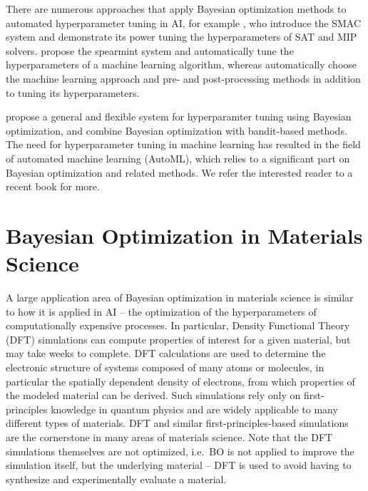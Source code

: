 \documentclass{article}
\begin{document}
There are numerous approaches that apply Bayesian optimization methods to
automated hyperparameter tuning in AI, for example
\cite{hutter_sequential_2011}, who introduce the SMAC system and demonstrate its
power tuning the hyperparameters of SAT and MIP solvers.
\cite{snoek_practical_2012} propose the spearmint system and automatically tune
the hyperparameters of a machine learning algorithm, whereas
\cite{feurer_efficient_2015,kotthoff_auto-weka_2017} automatically choose the
machine learning approach and pre- and post-processing methods in addition to
tuning its hyperparameters.

\cite{bischl_mlrmbo_2017} propose a general and flexible system for
hyperparamter tuning using Bayesian optimization, and \cite{falkner_bohb_2018}
combine Bayesian optimization with bandit-based methods. The need for
hyperparameter tuning in machine learning has resulted in the field of automated
machine learning (AutoML), which relies to a significant part on Bayesian
optimization and related methods. We refer the interested reader to a recent
book \cite{hutter_automated_2019} for more.

\section{Bayesian Optimization in Materials Science}

A large application area of Bayesian optimization in materials science is
similar to how it is applied in AI -- the optimization of the hyperparameters of
computationally expensive processes. In particular, Density Functional Theory
(DFT) simulations can compute properties of interest for a given material, but
may take weeks to complete. DFT calculations are used to determine the
electronic structure of systems composed of many atoms or molecules, in
particular the spatially dependent density of electrons, from which properties
of the modeled material can be derived. Such simulations rely only on
first-principles knowledge in quantum physics and are widely applicable to
many different types of materials. DFT and similar first-principles-based
simulations are the cornerstone in many areas of materials science. Note that
the DFT simulations themselves are not optimized, i.e.\ BO is not applied to
improve the simulation itself, but the underlying material -- DFT is used to
avoid having to synthesize and experimentally evaluate a material.
\end{document}
